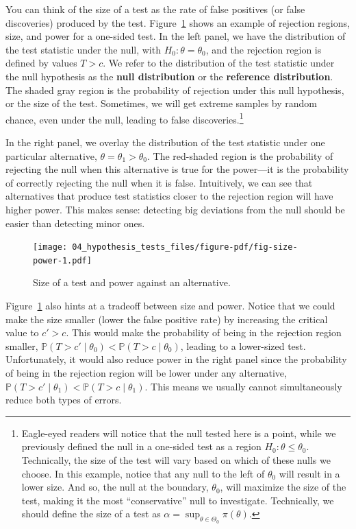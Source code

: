 \documentclass[
  letterpaper,
  DIV=11,
  numbers=noendperiod]{scrreprt}
\renewcommand{\P}{\mathbb{P}}
\theoremstyle{plain}
\theoremstyle{definition}
\theoremstyle{definition}
\theoremstyle{remark}
\begin{document}
You can think of the size of a test as the rate of false positives (or
false discoveries) produced by the test. Figure~\ref{fig-size-power}
shows an example of rejection regions, size, and power for a one-sided
test. In the left panel, we have the distribution of the test statistic
under the null, with \(H_0: \theta = \theta_0\), and the rejection
region is defined by values \(T > c\). We refer to the distribution of
the test statistic under the null hypothesis as the \textbf{null
distribution} or the \textbf{reference distribution}. The shaded gray
region is the probability of rejection under this null hypothesis, or
the size of the test. Sometimes, we will get extreme samples by random
chance, even under the null, leading to false discoveries.\footnote{Eagle-eyed
  readers will notice that the null tested here is a point, while we
  previously defined the null in a one-sided test as a region
  \(H_0: \theta \leq \theta_0\). Technically, the size of the test will
  vary based on which of these nulls we choose. In this example, notice
  that any null to the left of \(\theta_0\) will result in a lower size.
  And so, the null at the boundary, \(\theta_0\), will maximize the size
  of the test, making it the most ``conservative'' null to investigate.
  Technically, we should define the size of a test as
  \(\alpha = \sup_{\theta \in \Theta_0} \pi(\theta)\).}

In the right panel, we overlay the distribution of the test statistic
under one particular alternative, \(\theta = \theta_1 > \theta_0\). The
red-shaded region is the probability of rejecting the null when this
alternative is true for the power---it is the probability of correctly
rejecting the null when it is false. Intuitively, we can see that
alternatives that produce test statistics closer to the rejection region
will have higher power. This makes sense: detecting big deviations from
the null should be easier than detecting minor ones.

\begin{figure}[th]

{\centering \texttt{[image: 04\_hypothesis\_tests\_files/figure-pdf/fig-size-power-1.pdf]}

}

\caption{\label{fig-size-power}Size of a test and power against an
alternative.}

\end{figure}

Figure~\ref{fig-size-power} also hints at a tradeoff between size and
power. Notice that we could make the size smaller (lower the false
positive rate) by increasing the critical value to \(c' > c\). This
would make the probability of being in the rejection region smaller,
\(\P(T > c' \mid \theta_0) < \P(T > c \mid \theta_0)\), leading to a
lower-sized test. Unfortunately, it would also reduce power in the right
panel since the probability of being in the rejection region will be
lower under any alternative,
\(\P(T > c' \mid \theta_1) < \P(T > c \mid \theta_1)\). This means we
usually cannot simultaneously reduce both types of errors.
\end{document}
